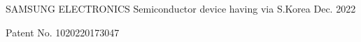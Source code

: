 

\begin{cventries}

  \cventry
    {SAMSUNG ELECTRONICS} %
    {Semiconductor device having via} %
    {S.Korea} %
    {Dec. 2022} %
    {
      \begin{cvitems} %
        \item {Patent No. 1020220173047}
      \end{cvitems}
    }
\end{cventries}
